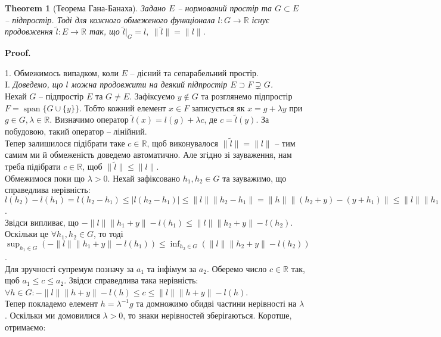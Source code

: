 \documentclass[a4paper, 10pt]{article}
\makeatletter
\theoremstyle{theoremdd}
\newtheorem{theorem}{Theorem}[subsection]
\theoremstyle{theoremdd}
\theoremstyle{theoremdd}
\theoremstyle{theoremdd}
\theoremstyle{theoremdd}
\theoremstyle{theoremdd}
\theoremstyle{theoremdd}
\theoremstyle{theoremdd}
\renewenvironment{proof}[1][Proof.\\]{\par
\pushQED{\hfill \qed}%
\normalfont \topsep6\p@\@plus6\p@\relax
\trivlist
\item\relax
{\bfseries
#1\@addpunct{.}}\hspace\labelsep\ignorespaces
}{%
\popQED\endtrivlist\@endpefalse
}
\DeclareMathOperator{\linspan}{span}
\makeatother
\begin{document}
\begin{theorem}[Теорема Гана-Банаха]
Задано $E$ -- нормований простір та $G \subset E$ -- підпростір. Тоді для кожного обмеженого функціонала $l \colon G \to \mathbb{R}$ існує продовження $\tilde{l} \colon E \to \mathbb{R}$ так, що $\tilde{l}|_G = l,\ \| \tilde{l} \| = \|l\|$.
\end{theorem}

\begin{proof}
1. Обмежимось випадком, коли $E$ -- дісний та сепарабельний простір.\\
I. \textit{Доведемо, що $l$ можна продовжити на деякий підпростір $E \supset F \supsetneq G$.}\\
Нехай $G$ -- підпростір $E$ та $G \neq E$. Зафіксуємо $y \notin G$ та розглянемо підпростір $F = \linspan\{G \cup \{y\}\}$. Тобто кожний елемент $x \in F$ записується як $x = g + \lambda y$ при $g \in G, \lambda \in \mathbb{R}$. Визначимо оператор $\tilde{l}(x) = l(g) + \lambda c$, де $c = \tilde{l}(y)$. За побудовою, такий оператор -- лінійний.\\
Тепер залишилося підібрати таке $c \in \mathbb{R}$, щоб виконувалося $\|\tilde{l}\| = \|l\|$ -- тим самим ми й обмеженість доведемо автоматично. Але згідно зі зауваження, нам треба підібрати $c \in \mathbb{R}$, щоб $\|\tilde{l}\| \leq \|l\|$.\\
Обмежимося поки що $\lambda > 0$. Нехай зафіксовано $h_1,h_2 \in G$ та зауважимо, що справедлива нерівність:\\
$l(h_2) - l(h_1) = l(h_2-h_1) \leq |l(h_2-h_1)| \leq \|l\| \|h_2 - h_1\| = \|h \| \|(h_2+y) - (y+h_1)\| \leq \|l\| \|h_1+y\| + \|l\| \|h_2+y\|$.\\
Звідси випливає, що $-\|l\| \|h_1+y\| - l(h_1) \leq \|l\| \|h_2+y\| - l(h_2)$.\\
Оскільки це $\forall h_1,h_2 \in G$, то тоді $\displaystyle\sup_{h_1 \in G} (-\|l\| \|h_1+y\| - l(h_1)) \leq \inf_{h_2 \in G} ( \|l\| \|h_2+y\| - l(h_2))$.\\
Для зручності супремум позначу за $a_1$ та інфімум за $a_2$. Оберемо число $c \in \mathbb{R}$ так, щоб $a_1 \leq c \leq a_2$. Звідси справедлива така нерівність:\\
$\forall h \in G: -\|l\| \|h+y\| - l(h) \leq c \leq \|l\| \|h+y\| - l(h)$.\\
Тепер покладемо елемент $h = \lambda^{-1}g$ та домножимо обидві частини нерівності на $\lambda$. Оскільки ми домовилися $\lambda > 0$, то знаки нерівностей зберігаються. Коротше, отримаємо:\\

\end{proof}
\end{document}
